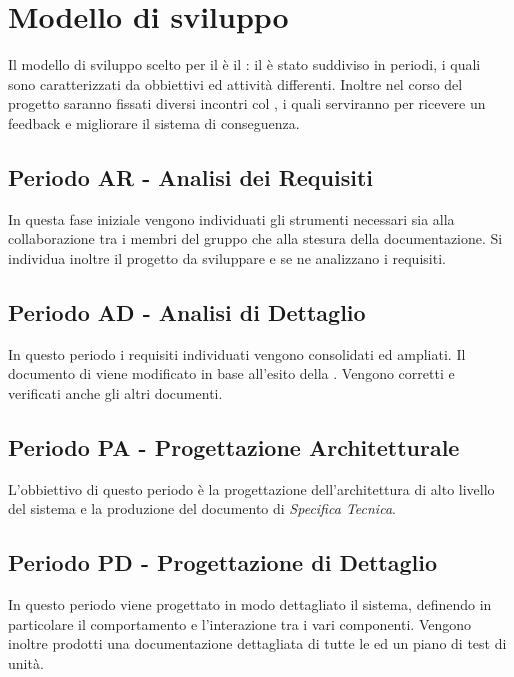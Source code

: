 \documentclass[./PianoDiProgetto.tex]{subfiles}
\begin{document}
  \section{Modello di sviluppo}

  Il modello di sviluppo scelto per il  è il : il
   è stato suddiviso in periodi, i quali sono caratterizzati da
  obbiettivi ed attività differenti. Inoltre nel corso del progetto saranno
  fissati diversi incontri col , i quali serviranno per ricevere un
  feedback e migliorare il sistema di conseguenza.

  \subsection{Periodo AR - Analisi dei Requisiti}

  In questa fase iniziale vengono individuati gli strumenti necessari sia alla
  collaborazione tra i membri del gruppo che alla stesura della documentazione.
  Si individua inoltre il progetto da sviluppare e se ne analizzano i requisiti.

  \subsection{Periodo AD - Analisi di Dettaglio}

  In questo periodo i requisiti individuati vengono consolidati ed ampliati. Il
  documento di \ARdoc viene modificato in base all'esito
  della \RR. Vengono corretti e verificati anche gli altri documenti.

  \subsection{Periodo PA - Progettazione Architetturale}

  L'obbiettivo di questo periodo è la progettazione dell'architettura di alto
  livello del sistema e la produzione del documento di \textit{Specifica Tecnica}.

  \subsection{Periodo PD - Progettazione di Dettaglio}

  In questo periodo viene progettato in modo dettagliato il sistema, definendo
  in particolare il comportamento e l'interazione tra i vari componenti. Vengono
  inoltre prodotti una documentazione dettagliata di tutte le  ed un piano
  di test di unità.
\end{document}
